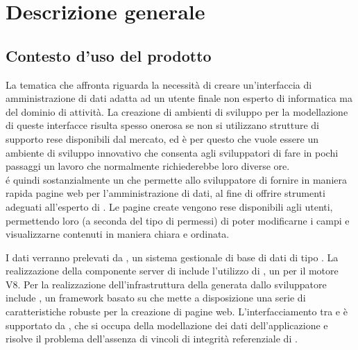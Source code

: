 \section{Descrizione generale}

	\subsection{Contesto d'uso del prodotto}
		
		La tematica che \ProjectName{} affronta riguarda la necessità di creare un'interfaccia di amministrazione di dati  adatta ad un utente finale non esperto di informatica ma del dominio di attività. La creazione di ambienti di sviluppo per la modellazione di queste interfacce risulta spesso onerosa se non si utilizzano strutture di supporto rese disponibili dal mercato, ed è per questo che \ProjectName{} vuole essere	un ambiente di sviluppo innovativo che consenta agli sviluppatori di fare in pochi passaggi un lavoro che normalmente richiederebbe loro diverse ore.\\
		\ProjectName{} é quindi sostanzialmente un  che permette allo sviluppatore di fornire in maniera rapida pagine web per l'amministrazione di dati, al fine di offrire strumenti adeguati all'esperto di . Le pagine create vengono rese disponibili agli utenti, permettendo loro (a seconda del tipo di permessi) di poter modificarne i campi e visualizzarne contenuti in maniera chiara e ordinata.
		
I dati verranno prelevati da , un sistema gestionale di base di dati di tipo . La realizzazione della componente server di \ProjectName{} include l'utilizzo di \textit{}, un   per il motore  V8. Per la realizzazione dell'infrastruttura della  generata dallo sviluppatore \ProjectName{} include \textit{}, un framework basato su  che mette a disposizione una serie di caratteristiche robuste per la creazione di pagine web. L'interfacciamento tra  e  è supportato da , che si occupa della modellazione dei dati dell'applicazione e risolve il problema dell'assenza di vincoli di integrità referenziale di .

